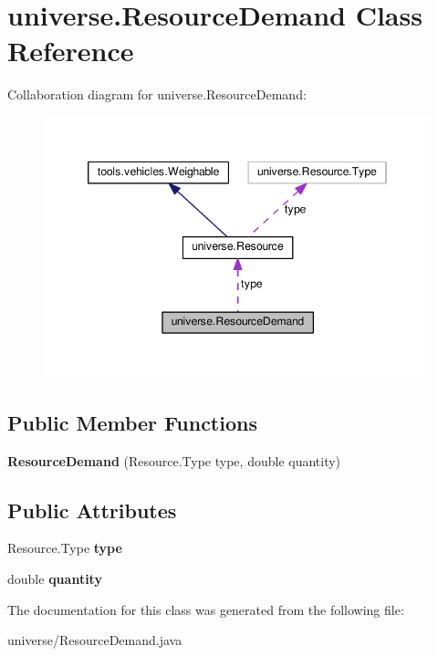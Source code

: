\hypertarget{classuniverse_1_1_resource_demand}{}\section{universe.\+Resource\+Demand Class Reference}
\label{classuniverse_1_1_resource_demand}


Collaboration diagram for universe.\+Resource\+Demand\+:
\nopagebreak
\begin{figure}[H]
\begin{center}
\leavevmode
\includegraphics[width=346pt]{classuniverse_1_1_resource_demand__coll__graph}
\end{center}
\end{figure}
\subsection*{Public Member Functions}
\begin{DoxyCompactItemize}
\item 
{\bfseries Resource\+Demand} (Resource.\+Type type, double quantity)\hypertarget{classuniverse_1_1_resource_demand_ad40b7c8a29572e5c19436b2bdb8e8c59}{}\label{classuniverse_1_1_resource_demand_ad40b7c8a29572e5c19436b2bdb8e8c59}

\end{DoxyCompactItemize}
\subsection*{Public Attributes}
\begin{DoxyCompactItemize}
\item 
Resource.\+Type {\bfseries type}\hypertarget{classuniverse_1_1_resource_demand_a865663018bb20388bcea6e0ba1eebc6e}{}\label{classuniverse_1_1_resource_demand_a865663018bb20388bcea6e0ba1eebc6e}

\item 
double {\bfseries quantity}\hypertarget{classuniverse_1_1_resource_demand_a0f0b49718e540f049c92eb48211698ba}{}\label{classuniverse_1_1_resource_demand_a0f0b49718e540f049c92eb48211698ba}

\end{DoxyCompactItemize}


The documentation for this class was generated from the following file\+:\begin{DoxyCompactItemize}
\item 
universe/Resource\+Demand.\+java\end{DoxyCompactItemize}
